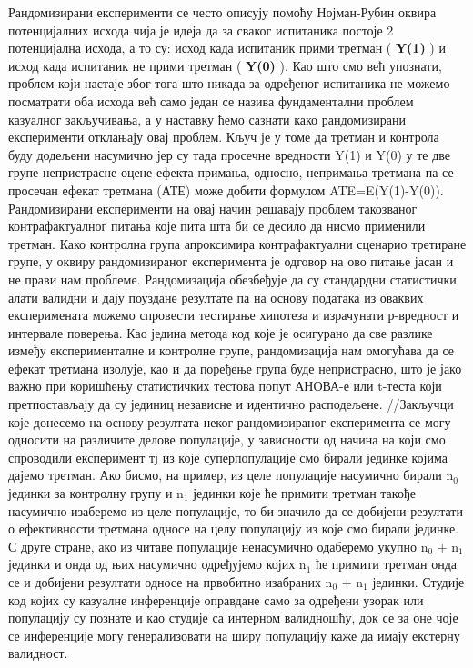 \documentclass[12pt, a4paper]{article}
\begin{document}
Рандомизирани експерименти се често описују помоћу Нојман-Рубин оквира потенцијалних исхода чија 
је идеја да за сваког испитаника постоје 2 потенцијална исхода, а то су:
исход када испитаник прими третман ( \textbf{Y(1)} ) и исход када испитаник не прими третман 
( \textbf{Y(0)} ). Као што смо већ упознати, проблем који настаје због тога што никада за 
одређеног испитаника не можемо посматрати оба исхода већ само један се назива фундаментални 
проблем казуалног закључивања, а у наставку ћемо сазнати како рандомизирани експерименти 
отклањају овај проблем. Кључ је у томе да третман и контрола буду додељени насумично јер су тада 
просечне вредности Y(1) и Y(0) у те две групе непристрасне оцене ефекта примања, односно, 
непримања третмана па се просечан ефекат третмана (АТЕ) може добити формулом ATE=E(Y(1)-Y(0)).
Рандомизирани експерименти на овај начин решавају проблем такозваног контрафактуалног питања које 
пита шта би се десило да нисмо применили третман. Како контролна група апроксимира контрафактуални 
сценарио третиране групе, у оквиру рандомизираног експеримента је одговор на ово питање јасан и 
не прави нам проблеме. Рандомизација обезбеђује да су стандардни статистички алати валидни и дају 
поуздане резултате па на основу података из оваквих експеримената можемо спровести тестирање 
хипотеза и израчунати р-вредност и интервале поверења. Као једина метода код које је осигурано да 
све разлике између експерименталне и контролне групе, рандомизација нам омогућава да се ефекат 
третмана изолује, као и да поређење група буде непристрасно, што је јако важно при коришћењу 
статистичких тестова попут АНОВА-е или t-теста који претпостављају да су јединиц независне и 
идентично расподељене.
//Закључци које донесемо на основу резултата неког рандомизираног експеримента се могу односити на 
различите делове популације, у зависности од начина на који смо спроводили експеримент тј из које 
суперпопулације смо бирали јединке којима дајемо третман. Ако бисмо, на пример, из целе популације 
насумично бирали n$_0$ јединки за контролну групу и n$_1$ јединки које ће примити третман такође 
насумично изаберемо из целе популације, то би значило да се добијени резултати о ефективности 
третмана односе на целу популацију из које смо бирали јединке.
С друге стране, ако из читаве популације ненасумично одаберемо укупно n$_0$ + n$_1$ јединки и онда 
од њих насумично одређујемо којих n$_1$ ће примити третман онда се и добијени резултати односе на 
првобитно изабраних n$_0$ + n$_1$ јединки. Студије код којих су казуалне инференције оправдане 
само за одређени узорак или популацију су познате и као студије са интерном валидношћу, док се за 
оне чоје се инференције могу генерализовати на ширу популацију каже да имају екстерну валидност.
\end{document}
